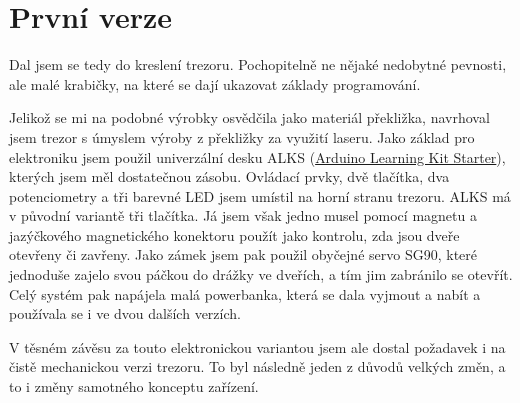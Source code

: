 \section{První verze}

Dal jsem se tedy do kreslení trezoru. Pochopitelně ne nějaké nedobytné pevnosti, ale malé
krabičky,   %
na které se dají ukazovat základy programování. 

Jelikož se mi na podobné
výrobky osvědčila jako materiál překližka, navrhoval jsem trezor s úmyslem výroby z překližky 
za využití laseru. 
Jako základ pro elektroniku  jsem použil univerzální 
desku ALKS (\href{https://github.com/RoboticsBrno/ArduinoLearningKitStarter}{Arduino Learning Kit Starter}), 
kterých jsem měl dostatečnou zásobu. Ovládací prvky, %
dvě tlačítka, dva potenciometry a tři
barevné LED jsem umístil na horní stranu trezoru. ALKS má v původní variantě
tři tlačítka. Já jsem však jedno musel pomocí magnetu a jazýčkového magnetického konektoru použít
jako kontrolu, zda jsou dveře otevřeny či zavřeny. Jako zámek jsem pak použil obyčejné servo
SG90, které jednoduše zajelo svou páčkou do drážky ve dveřích, a tím jim zabránilo 
se otevřít. Celý systém pak napájela malá powerbanka, která se dala vyjmout a nabít  
a používala se i ve dvou dalších verzích.


V těsném závěsu za touto elektronickou variantou
jsem ale dostal požadavek i na čistě mechanickou verzi trezoru. To byl následně jeden z 
 důvodů velkých změn, a to i změny samotného konceptu zařízení.

\newpage